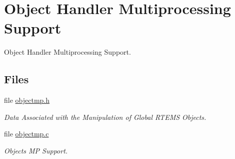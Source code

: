 \hypertarget{group__RTEMSScoreObjectMP}{}\section{Object Handler Multiprocessing Support}
\label{group__RTEMSScoreObjectMP}


Object Handler Multiprocessing Support.  


\subsection*{Files}
\begin{DoxyCompactItemize}
\item 
file \mbox{\hyperlink{objectmp_8h}{objectmp.\+h}}
\begin{DoxyCompactList}\small\item\em Data Associated with the Manipulation of Global R\+T\+E\+MS Objects. \end{DoxyCompactList}\item 
file \mbox{\hyperlink{objectmp_8c}{objectmp.\+c}}
\begin{DoxyCompactList}\small\item\em Objects MP Support. \end{DoxyCompactList}\end{DoxyCompactItemize}
